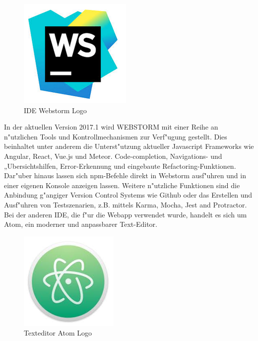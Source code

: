 \documentclass[a4paper, 11pt]{scrreprt}
\begin{document}
\begin{figure} [h]
\begin{center}

\includegraphics[scale=0.6]{Webstorm.png}
\caption{IDE Webstorm Logo}
\label{webstorm_logo}

\end{center}
\end{figure}

In der aktuellen Version 2017.1 wird WEBSTORM mit einer Reihe an n"utzlichen Tools und Kontrollmechanismen zur Verf"ugung gestellt. Dies beinhaltet unter anderem die Unterst"utzung aktueller Javascript Frameworks wie Angular, React, Vue.js und Meteor. Code-completion, Navigations- und „Ubersichtshilfen, Error-Erkennung und eingebaute Refactoring-Funktionen. \\

Dar"uber hinaus lassen sich npm-Befehle direkt in Webstorm ausf"uhren und in einer eigenen Konsole anzeigen lassen. Weitere n"utzliche Funktionen sind die Anbindung g"angiger Version Control Systems wie Github oder das Erstellen und Ausf"uhren von Testszenarien, z.B. mittels Karma, Mocha, Jest and Protractor. \\

Bei der anderen IDE, die f"ur die Webapp verwendet wurde, handelt es sich um Atom, ein moderner und anpassbarer Text-Editor. \\

\begin{figure} [h]
\begin{center}

\includegraphics[scale=0.8]{atom.png}
\caption{Texteditor Atom Logo}
\label{webstorm_logo}

\end{center}
\end{figure}
\end{document}
